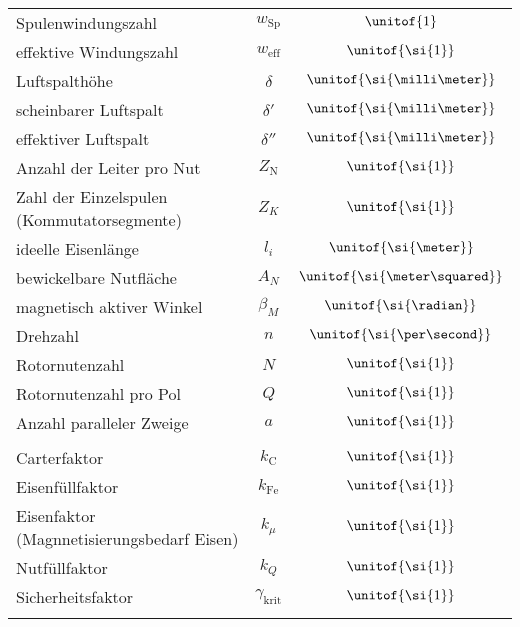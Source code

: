 {{\begin{tabular*}{\columnwidth}{p{4.2cm}cc}
Spulenwindungszahl & $w_\text{Sp}$ & $\unitof{1}$\\
effektive Windungszahl & $w_\text{eff}$ & $\unitof{\si{1}}$\\
Luftspalthöhe & $\delta$ & $\unitof{\si{\milli\meter}}$\\
scheinbarer Luftspalt & $\delta'$ & $\unitof{\si{\milli\meter}}$\\
effektiver Luftspalt & $\delta''$ & $\unitof{\si{\milli\meter}}$\\
Anzahl der Leiter pro Nut & $Z_\text{N}$ & $\unitof{\si{1}}$\\
Zahl der Einzelspulen (Kommutatorsegmente) & $Z_K$ & $\unitof{\si{1}}$\\
ideelle Eisenlänge & $l_i$ & $\unitof{\si{\meter}}$\\
bewickelbare Nutfläche & $A_N$ & $\unitof{\si{\meter\squared}}$\\
magnetisch aktiver Winkel & $\beta_M$ & $\unitof{\si{\radian}}$\\
Drehzahl & $n$ & $\unitof{\si{\per\second}}$\\
Rotornutenzahl & $N$ & $\unitof{\si{1}}$\\
Rotornutenzahl pro Pol & $Q$ & $\unitof{\si{1}}$\\
Anzahl paralleler Zweige & $a$ & $\unitof{\si{1}}$\\
\cmrule
\multicolumn{3}{c}{\textbf{Näherungsfaktoren}}\\
\cmrule
Carterfaktor & $k_\text{C}$ & $\unitof{\si{1}}$\\
Eisenfüllfaktor & $k_\text{Fe}$ & $\unitof{\si{1}}$\\
Eisenfaktor (Magnnetisierungsbedarf Eisen) & $k_\mu$ & $\unitof{\si{1}}$\\
Nutfüllfaktor & $k_Q$ & $\unitof{\si{1}}$\\
Sicherheitsfaktor & $\gamma_\text{krit}$ & $\unitof{\si{1}}$\\
\cbrule
\end{tabular*}
}
}
